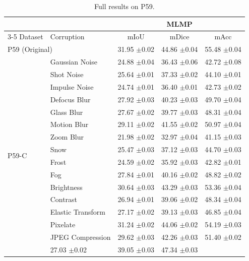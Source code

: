 \documentclass{article}
\begin{document}
\begin{table}[t]
\centering
\caption{Full results on P59.}
\label{tab:results_p59}
\begin{tabular}{ll|ccc}
\toprule
 & & \multicolumn{3}{c}{MLMP} \\
\cmidrule(lr){3-5}
Dataset & Corruption & mIoU & mDice & mAcc \\
\midrule
\multicolumn{2}{l}{P59 (Original)} & 31.95 {\scriptsize $\pm$0.02} & 44.86 {\scriptsize $\pm$0.04} & 55.48 {\scriptsize $\pm$0.04} \\
\multirow{16}{*}{P59-C} & Gaussian Noise & 24.88 {\scriptsize $\pm$0.04} & 36.43 {\scriptsize $\pm$0.06} & 42.72 {\scriptsize $\pm$0.08} \\
 & Shot Noise & 25.64 {\scriptsize $\pm$0.01} & 37.33 {\scriptsize $\pm$0.02} & 44.10 {\scriptsize $\pm$0.01} \\
 & Impulse Noise & 24.74 {\scriptsize $\pm$0.01} & 36.40 {\scriptsize $\pm$0.01} & 42.73 {\scriptsize $\pm$0.02} \\
 & Defocus Blur & 27.92 {\scriptsize $\pm$0.03} & 40.23 {\scriptsize $\pm$0.03} & 49.70 {\scriptsize $\pm$0.04} \\
 & Glass Blur & 27.67 {\scriptsize $\pm$0.02} & 39.77 {\scriptsize $\pm$0.03} & 48.31 {\scriptsize $\pm$0.04} \\
 & Motion Blur & 29.11 {\scriptsize $\pm$0.02} & 41.55 {\scriptsize $\pm$0.02} & 50.97 {\scriptsize $\pm$0.04} \\
 & Zoom Blur & 21.98 {\scriptsize $\pm$0.02} & 32.97 {\scriptsize $\pm$0.04} & 41.15 {\scriptsize $\pm$0.03} \\
 & Snow & 25.47 {\scriptsize $\pm$0.03} & 37.12 {\scriptsize $\pm$0.03} & 44.70 {\scriptsize $\pm$0.03} \\
 & Frost & 24.59 {\scriptsize $\pm$0.02} & 35.92 {\scriptsize $\pm$0.03} & 42.82 {\scriptsize $\pm$0.01} \\
 & Fog & 27.84 {\scriptsize $\pm$0.01} & 40.16 {\scriptsize $\pm$0.02} & 48.82 {\scriptsize $\pm$0.02} \\
 & Brightness & 30.64 {\scriptsize $\pm$0.03} & 43.29 {\scriptsize $\pm$0.03} & 53.36 {\scriptsize $\pm$0.04} \\
 & Contrast & 26.94 {\scriptsize $\pm$0.01} & 39.06 {\scriptsize $\pm$0.02} & 48.34 {\scriptsize $\pm$0.04} \\
 & Elastic Transform & 27.17 {\scriptsize $\pm$0.02} & 39.13 {\scriptsize $\pm$0.03} & 46.85 {\scriptsize $\pm$0.04} \\
 & Pixelate & 31.24 {\scriptsize $\pm$0.02} & 44.06 {\scriptsize $\pm$0.02} & 54.19 {\scriptsize $\pm$0.03} \\
 & JPEG Compression & 29.62 {\scriptsize $\pm$0.03} & 42.26 {\scriptsize $\pm$0.03} & 51.40 {\scriptsize $\pm$0.02} \\
\cmidrule(l){2-5}
\multicolumn{2}{l}{\textit{P59-C Average}} & 27.03 {\scriptsize $\pm$0.02} & 39.05 {\scriptsize $\pm$0.03} & 47.34 {\scriptsize $\pm$0.03} \\
\bottomrule
\end{tabular}
\end{table}
\end{document}
